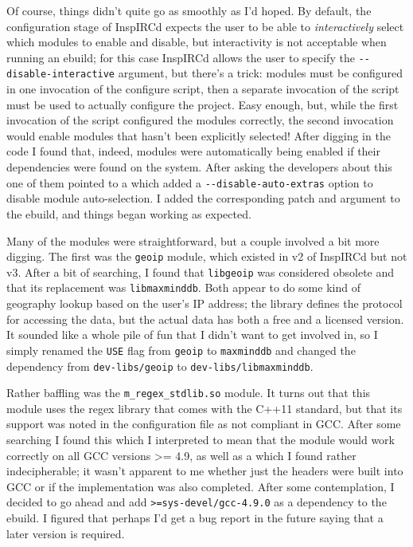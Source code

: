 \documentclass{article}
\begin{document}
Of course, things didn't quite go as smoothly as I'd hoped.  By default, the configuration stage of InspIRCd expects the user to be able to \emph{interactively} select which modules to enable and disable, but interactivity is not acceptable when running an ebuild; for this case InspIRCd allows the user to specify the \verb|--disable-interactive| argument, but there's a trick: modules must be configured in one invocation of the configure script, then a separate invocation of the script must be used to actually configure the project.  Easy enough, but, while the first invocation of the script configured the modules correctly, the second invocation would enable modules that hasn't been explicitly selected!  After digging in the code I found that, indeed, modules were automatically being enabled if their dependencies were found on the system.  After asking the developers about this one of them pointed to a  which added a \verb|--disable-auto-extras| option to disable module auto-selection.  I added the corresponding patch and argument to the ebuild, and things began working as expected.

Many of the modules were straightforward, but a couple involved a bit more digging.  The first was the \texttt{geoip} module, which existed in v2 of InspIRCd but not v3.  After a bit of searching, I found that \texttt{libgeoip} was considered obsolete and that its replacement was \texttt{libmaxminddb}.  Both appear to do some kind of geography lookup based on the user's IP address; the library defines the protocol for accessing the data, but the actual data has both a free and a licensed version.  It sounded like a whole pile of fun that I didn't want to get involved in, so I simply renamed the \texttt{USE} flag from \texttt{geoip} to \texttt{maxminddb} and changed the dependency from \texttt{dev-libs/geoip} to \texttt{dev-libs/libmaxminddb}.

Rather baffling was the \texttt{m_regex_stdlib.so} module.  It turns out that this module uses the regex library that comes with the C++11 standard, but that its support was noted in the configuration file as not compliant in GCC.  After some searching I found this  which I interpreted to mean that the module would work correctly on all GCC versions >= 4.9, as well as a  which I found rather indecipherable; it wasn't apparent to me whether just the headers were built into GCC or if the implementation was also completed.  After some contemplation, I decided to go ahead and add \texttt{>=sys-devel/gcc-4.9.0} as a dependency to the ebuild.  I figured that perhaps I'd get a bug report in the future saying that a later version is required.
\end{document}
